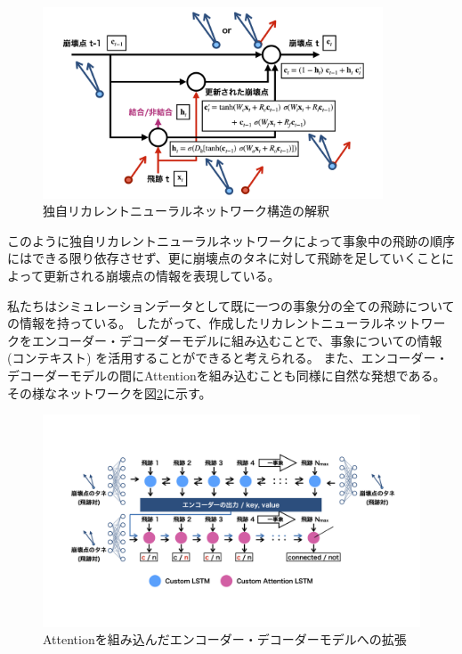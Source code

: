 \begin{figure}[htbp]
 \centering
 \includegraphics[width=0.9\textwidth, clip]{Figure/3Networks/3-4-1-3Interpretation.png}
 \caption{独自リカレントニューラルネットワーク構造の解釈}
 \label{3-4-1-3Interpretation}
\end{figure}

このように独自リカレントニューラルネットワークによって事象中の飛跡の順序にはできる限り依存させず、更に崩壊点のタネに対して飛跡を足していくことによって更新される崩壊点の情報を表現している。

私たちはシミュレーションデータとして既に一つの事象分の全ての飛跡についての情報を持っている。
したがって、作成したリカレントニューラルネットワークをエンコーダー・デコーダーモデルに組み込むことで、事象についての情報 (コンテキスト) を活用することができると考えられる。
また、エンコーダー・デコーダーモデルの間にAttentionを組み込むことも同様に自然な発想である。
その様なネットワークを図\ref{3-4-1-4EncoderDecoderVLSTM}に示す。

\begin{figure}[htbp]
 \centering
 \includegraphics[trim = 100 200 100 100, width=1.0\textwidth, clip]{Figure/3Networks/3-4-1-4EncoderDecoderVLSTM.png}
 \caption{Attentionを組み込んだエンコーダー・デコーダーモデルへの拡張}
 \label{3-4-1-4EncoderDecoderVLSTM}
\end{figure}

